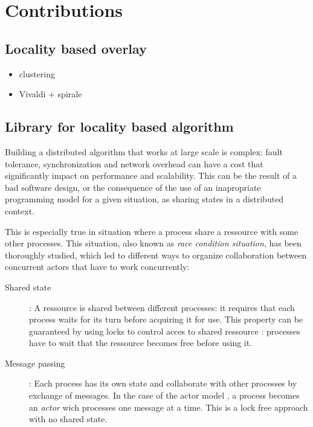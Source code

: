 \section{Contributions}


\subsection{Locality based overlay}

\begin{itemize}
	
	\item clustering
	
	\item Vivaldi + spirale

\end{itemize}

\subsection{Library for locality based algorithm}

Building a distributed algorithm that works at large scale is complex: fault
tolerance, synchronization and network overhead can have a cost that 
significantly impact on performance and scalability. This can be the result of a
bad software design, or the consequence of the use of an inapropriate 
programming model for a given situation, as sharing states in a distributed
context.

This is especially true in situation where a process share a ressource with some 
other processes. This situation, also known as \emph{race condition situation}, 
has been thoroughly studied, which led to different ways to organize 
collaboration between concurrent actors that have to work concurrently:

\begin{description}

	\item [Shared state] : A ressource is shared between different processes: it
	requires that each process waits for its turn before acquiring it for use.
	This property can be guaranteed by using locks to control acces to shared
	ressource : processes have to wait that the ressource becomes free
	before using it.

	\item [Message passing] : Each process has its own state and collaborate
	with other processes by exchange of messages. In the case of the actor model 
	\cite{Hewitt1973}, a process becomes an \emph{actor} wich processes one
	message at a time. This is a lock free approach with no	shared state.

\end{description}

